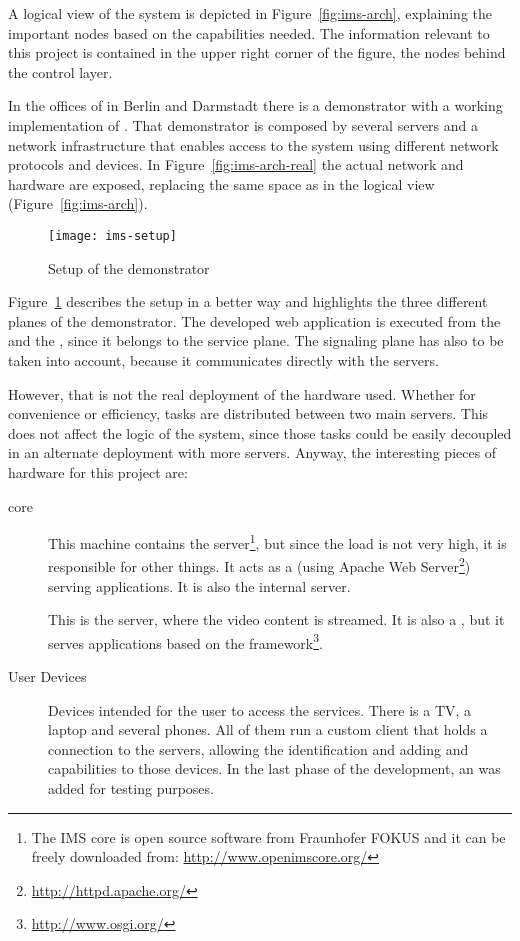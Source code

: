 A logical view of the system is depicted in Figure~\ref{fig:ims-arch}, explaining the important nodes based on the capabilities needed.
The information relevant to this project is contained in the upper right corner of the figure, the nodes behind the control layer.

In the offices of  in Berlin and Darmstadt there is a demonstrator with a working implementation of .
That demonstrator is composed by several servers and a network infrastructure that enables access to the system using different network protocols and devices.
In Figure~\ref{fig:ims-arch-real} the actual network and hardware are exposed, replacing the same space as in the logical view (Figure~\ref{fig:ims-arch}).

\begin{figure}[htbp]
  \centering
    \texttt{[image: ims-setup]}
  \caption{Setup of the demonstrator}
  \label{fig:ims-setup}
\end{figure}

Figure~\ref{fig:ims-setup} describes the setup in a better way and highlights the three different planes of the demonstrator.
The developed web application is executed from the  and the , since it belongs to the service plane.
The signaling plane has also to be taken into account, because it communicates directly with the servers.

However, that is not the real deployment of the hardware used.
Whether for convenience or efficiency, tasks are distributed between two main servers.
This does not affect the logic of the system, since those tasks could be easily decoupled in an alternate deployment with more servers.
Anyway, the interesting pieces of hardware for this project are:

\begin{description}
  \item[ core] This machine contains the  server\footnote{The IMS core is open source software from Fraunhofer FOKUS and it can be freely downloaded from: \url{http://www.openimscore.org/}}, but since the  load is not very high, it is responsible for other things.
  It acts as a  (using Apache Web Server\footnote{\url{http://httpd.apache.org/}}) serving  applications.
  It is also the internal  server.
  \item[] This is the  server, where the video content is streamed.
  It is also a , but it serves  applications based on the  framework\footnote{\url{http://www.osgi.org/}}.
  \item[User Devices] Devices intended for the user to access the services.
  There is a TV, a laptop and several phones.
  All of them run a custom  client that holds a connection to the servers, allowing the identification and adding  and  capabilities to those devices.
  In the last phase of the development, an  was added for testing purposes.
\end{description}

